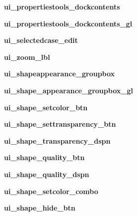 \begin{DoxyCompactItemize}
\hypertarget{a00099_a26eae51ef2c81417b401501bca6ce10a}{}\label{a00099_a26eae51ef2c81417b401501bca6ce10a} 
{\bfseries ui\+\_\+propertiestools\+\_\+dockcontents}
\item 
\hypertarget{a00099_a83c00b5893231c0eba98a9e8e22ac09c}{}\label{a00099_a83c00b5893231c0eba98a9e8e22ac09c} 
{\bfseries ui\+\_\+propertiestools\+\_\+dockcontents\+\_\+gl}
\item 
\hypertarget{a00099_a0b802c9e05ee17be9d7fd6a867b2aa0f}{}\label{a00099_a0b802c9e05ee17be9d7fd6a867b2aa0f} 
{\bfseries ui\+\_\+selectedcase\+\_\+edit}
\item 
\hypertarget{a00099_ab3983cab5036a720f91ae2ae62374f73}{}\label{a00099_ab3983cab5036a720f91ae2ae62374f73} 
{\bfseries ui\+\_\+zoom\+\_\+lbl}
\item 
\hypertarget{a00099_aa660273332cc5da8d46ae6e465323eda}{}\label{a00099_aa660273332cc5da8d46ae6e465323eda} 
{\bfseries ui\+\_\+shapeappearance\+\_\+groupbox}
\item 
\hypertarget{a00099_a04a31fbb2f456070dfd32b6f122923b6}{}\label{a00099_a04a31fbb2f456070dfd32b6f122923b6} 
{\bfseries ui\+\_\+shape\+\_\+appearance\+\_\+groupbox\+\_\+gl}
\item 
\hypertarget{a00099_a2b9029cd44541c9b09508f9cddbbffd7}{}\label{a00099_a2b9029cd44541c9b09508f9cddbbffd7} 
{\bfseries ui\+\_\+shape\+\_\+setcolor\+\_\+btn}
\item 
\hypertarget{a00099_a29e4e3e1bc1a96b5b5970f03ccdc3258}{}\label{a00099_a29e4e3e1bc1a96b5b5970f03ccdc3258} 
{\bfseries ui\+\_\+shape\+\_\+settransparency\+\_\+btn}
\item 
\hypertarget{a00099_a0ad9bf35073cf45204d5ddca0156df53}{}\label{a00099_a0ad9bf35073cf45204d5ddca0156df53} 
{\bfseries ui\+\_\+shape\+\_\+transparency\+\_\+dspn}
\item 
\hypertarget{a00099_a4ee4bf54cb958bebdc43e8598dcdd459}{}\label{a00099_a4ee4bf54cb958bebdc43e8598dcdd459} 
{\bfseries ui\+\_\+shape\+\_\+quality\+\_\+btn}
\item 
\hypertarget{a00099_a091706f3093b19dadcf896b4fc354dc1}{}\label{a00099_a091706f3093b19dadcf896b4fc354dc1} 
{\bfseries ui\+\_\+shape\+\_\+quality\+\_\+dspn}
\item 
\hypertarget{a00099_a6412380402adf28d010e459b538c97be}{}\label{a00099_a6412380402adf28d010e459b538c97be} 
{\bfseries ui\+\_\+shape\+\_\+setcolor\+\_\+combo}
\item 
\hypertarget{a00099_af27038ec976b97c8007f5914afb2f4ed}{}\label{a00099_af27038ec976b97c8007f5914afb2f4ed} 
{\bfseries ui\+\_\+shape\+\_\+hide\+\_\+btn}

\end{DoxyCompactItemize}
